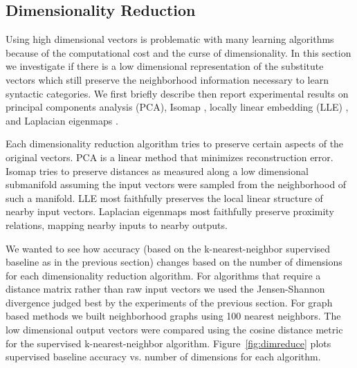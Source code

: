 \subsection{Dimensionality Reduction}
\label{sec:dimreduce}

Using high dimensional vectors is problematic with many learning
algorithms because of the computational cost and the curse of
dimensionality.  In this section we investigate if there is a low
dimensional representation of the substitute vectors which still
preserve the neighborhood information necessary to learn syntactic
categories.  We first briefly describe then report experimental
results on principal components analysis (PCA), Isomap
\cite{tenenbaum2000global}, locally linear embedding (LLE)
\cite{roweis2000nonlinear}, and Laplacian eigenmaps
\cite{belkin2003laplacian}.

Each dimensionality reduction algorithm tries to preserve certain
aspects of the original vectors.  PCA is a linear method that
minimizes reconstruction error.  Isomap tries to preserve distances as
measured along a low dimensional submanifold assuming the input
vectors were sampled from the neighborhood of such a manifold.  LLE
most faithfully preserves the local linear structure of nearby input
vectors.  Laplacian eigenmaps most faithfully preserve proximity
relations, mapping nearby inputs to nearby outputs.

We wanted to see how accuracy (based on the
k-nearest-neighbor supervised baseline as in the previous section)
changes based on the number of dimensions for each dimensionality
reduction algorithm.
%
For algorithms that require a distance matrix rather than raw input
vectors we used the Jensen-Shannon divergence judged best by the
experiments of the previous section.  For graph based methods we built
neighborhood graphs using 100 nearest neighbors.  The low dimensional
output vectors were compared using the cosine distance metric for the
supervised k-nearest-neighbor algorithm.  Figure~\ref{fig:dimreduce}
plots supervised baseline accuracy vs. number of dimensions for each
algorithm.

